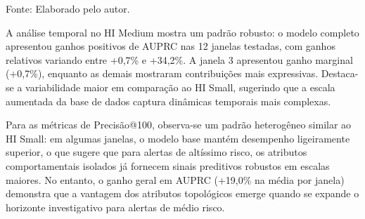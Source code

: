 \documentclass[titlepage,a4paper,oneside,onecolumn,12pt]{report}
\newcommand{\source}[1]{\par\noindent\footnotesize Fonte: #1\par}
\begin{document}
\begin{table}
    \centering
    \caption{Comparação de desempenho por janela temporal (HI Medium - seleção)}
    \label{tab:window-comparison-medium}
    \source{Elaborado pelo autor.}
\end{table}

A análise temporal no HI Medium mostra um padrão robusto: o modelo completo apresentou ganhos positivos de AUPRC nas 12 janelas testadas, com ganhos relativos variando entre +0,7\% e +34,2\%. A janela 3 apresentou ganho marginal (+0,7\%), enquanto as demais mostraram contribuições mais expressivas. Destaca-se a variabilidade maior em comparação ao HI Small, sugerindo que a escala aumentada da base de dados captura dinâmicas temporais mais complexas.

Para as métricas de Precisão@100, observa-se um padrão heterogêneo similar ao HI Small: em algumas janelas, o modelo base mantém desempenho ligeiramente superior, o que sugere que para alertas de altíssimo risco, os atributos comportamentais isolados já fornecem sinais preditivos robustos em escalas maiores. No entanto, o ganho geral em AUPRC (+19,0\% na média por janela) demonstra que a vantagem dos atributos topológicos emerge quando se expande o horizonte investigativo para alertas de médio risco.
\end{document}
